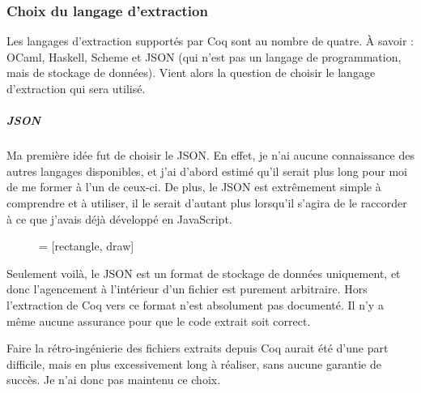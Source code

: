 \documentclass[]{article}
\begin{document}
\subsubsection{Choix du langage d'extraction}
Les langages d'extraction supportés par Coq sont au nombre de quatre. À savoir : OCaml, Haskell, Scheme et JSON (qui n'est pas un langage de programmation, mais de stockage de données). Vient alors la question de choisir le langage d'extraction qui sera utilisé.

\subparagraph*{JSON}
Ma première idée fut de choisir le JSON. En effet, je n'ai aucune connaissance des autres langages disponibles, et j'ai d'abord estimé qu'il serait plus long pour moi de me former à l'un de ceux-ci. De plus, le JSON est extrêmement simple à comprendre et à utiliser, il le serait d'autant plus lorsqu'il s'agira de le raccorder à ce que j'avais déjà développé en JavaScript.
\begin{figure}[H]
	\begin{center}
		 = [rectangle, draw]
	\end{center}
\end{figure}
Seulement voilà, le JSON est un format de stockage de données uniquement, et donc l'agencement à l'intérieur d'un fichier est purement arbitraire. Hors l'extraction de Coq vers ce format n'est absolument pas documenté. Il n'y a même aucune assurance pour que le code extrait soit correct.

Faire la rétro-ingénierie des fichiers extraits depuis Coq aurait été d'une part difficile, mais en plus excessivement long à réaliser, sans aucune garantie de succès. Je n'ai donc pas maintenu ce choix.
\end{document}
